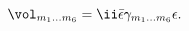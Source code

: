 \begin{equation}
   \vol_{m_1\dots m_6} = \ii \bar{\epsilon} \gamma_{m_1\dots m_6} \epsilon .
\end{equation}

